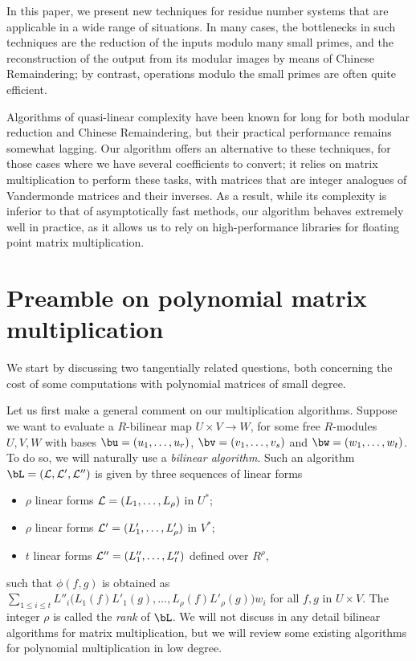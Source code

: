 \documentclass[acmtoms]{acmsmall}
\begin{document}
In this paper, we present new techniques for residue number systems
that are applicable in a wide range of situations. In many cases, the
bottlenecks in such techniques are the reduction of the inputs modulo
many small primes, and the reconstruction of the output from its
modular images by means of Chinese Remaindering; by contrast,
operations modulo the small primes are often quite efficient.

Algorithms of quasi-linear complexity have been known for long for
both modular reduction and Chinese Remaindering, but their practical
performance remains somewhat lagging. Our algorithm offers an
alternative to these techniques, for those cases where we have several
coefficients to convert; it relies on matrix multiplication to perform
these tasks, with matrices that are integer analogues of Vandermonde
matrices and their inverses. As a result, while its complexity is
inferior to that of asymptotically fast methods, our algorithm behaves
extremely well in practice, as it allows us to rely on
high-performance libraries for floating point matrix multiplication.


\section{Preamble on polynomial matrix multiplication}

We start by discussing two tangentially related questions, both
concerning the cost of some computations with polynomial matrices of
small degree.

Let us first make a general comment on our multiplication
algorithms. Suppose we want to evaluate a $R$-bilinear map $U \times V
\to W$, for some free $R$-modules $U,V,W$ with bases
$\bu=(u_1,\dots,u_r)$, $\bv=(v_1,\dots,v_s)$ and
$\bw=(w_1,\dots,w_t)$. To do so, we will naturally use a {\em bilinear
  algorithm}. Such an algorithm $\bL=({\cal L},{\cal L}',{\cal L}'')$
is given by three sequences of linear forms
\begin{itemize}
\item $\rho$ linear forms ${\cal L}=(L_1,\dots,L_\rho)$ in $U^*$;
\item $\rho$ linear forms ${\cal L}'=(L'_1,\dots,L'_\rho)$ in $V^*$;
\item $t$ linear forms ${\cal L''}=(L''_1,\dots,L''_t)$ defined over $R^{\rho}$,
\end{itemize}
such that $\phi(f,g)$ is obtained as $\sum_{1 \le i \le t} L''_i\big(
L_1 (f)L'_1(g),\dots,L_\rho (f)L'_\rho(g)\big ) w_i$ for all $f,g$ in
$U \times V$. The integer $\rho$ is called the {\em rank} of $\bL$.
We will not discuss in any detail bilinear algorithms for matrix
multiplication, but we will review some existing algorithms for
polynomial multiplication in low degree.
\end{document}
